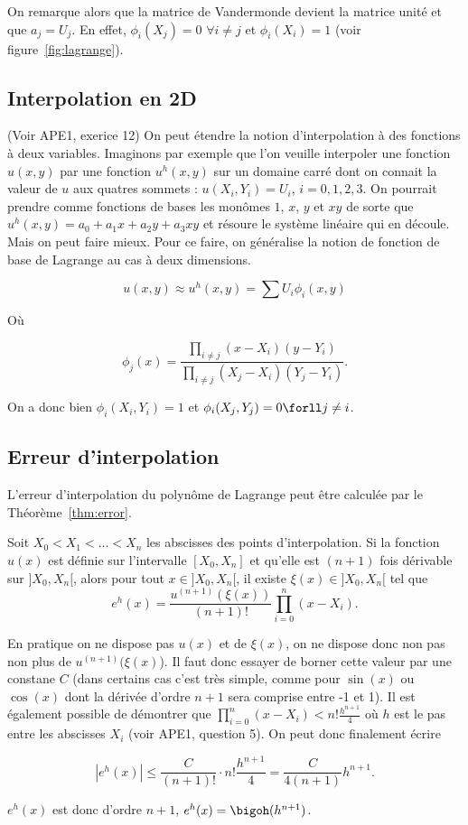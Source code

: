 On remarque alors que la matrice de Vandermonde devient la matrice
unité et que $a_j = U_j$. En effet, $\phi_i(X_j) = 0$ $\forall i \neq j$
et $\phi_i(X_i) = 1$ (voir figure~\ref{fig:lagrange}).

\subsection{Interpolation en 2D}
(Voir APE1, exerice 12) On peut étendre la notion d'interpolation à des fonctions à deux variables. Imaginons 
par exemple que l'on veuille interpoler une fonction $u(x, y)$ par une fonction $u^h(x, y)$
sur un domaine carré dont on connait la valeur de $u$ aux quatres sommets : $u(X_i, Y_i) = U_i$,
$i = 0, 1, 2, 3.$ On pourrait prendre comme fonctions de bases les monômes $1$, $x$, $y$ et $xy$
de sorte que $u^h(x, y) = a_0 + a_1x + a_2y + a_3xy$ et résoure le système linéaire qui en découle.
Mais on peut faire mieux. Pour ce faire, on généralise la notion de fonction de base de Lagrange au 
cas à deux dimensions.

$$u(x, y) \approx u^h(x, y) = \sum U_i \phi_i(x, y)$$

Où

$$\phi_j(x) = \frac{\prod_{i \neq j} (x - X_i)(y - Y_i)}
  {\prod_{i \neq j} (X_j - X_i)(Y_j - Y_i)}.$$
	
On a donc bien $\phi_i(X_i, Y_i) = 1$ et $\phi_i(X_j, Y_j) = 0 \forll j\neq i$.  

\subsection{Erreur d'interpolation}
L'erreur d'interpolation du polynôme de Lagrange peut être calculée
par le Théorème~\ref{thm:error}.
\begin{mytheo}
  \label{thm:error}
  Soit $X_0 < X_1 < \ldots < X_n$ les abscisses des points d'interpolation.
  Si la fonction $u(x)$ est définie sur l'intervalle $[X_0, X_n]$ et qu'elle
  est $(n+1)$ fois dérivable sur $]X_0, X_n[$, alors pour tout
  $x \in ]X_0, X_n[$, il existe $\xi(x) \in ]X_0, X_n[$ tel que
  \[ e^h(x) = \frac{u^{(n+1)}(\xi(x))}{(n+1)!}
  \prod_{i=0}^n (x - X_i). \]
\end{mytheo}

\begin{myrem}\label{rem:borne}
	En pratique on ne dispose pas $u(x)$ et de $\xi(x)$, on ne dispose donc non 
	pas non plus de	$u^{(n+1)}(\xi(x)$). Il faut donc essayer de borner cette
	valeur par une constane $C$ (dans certains cas c'est très simple, comme
	pour $\sin(x)$ ou $\cos(x)$ dont la dérivée d'ordre $n+1$ sera comprise
	entre -1 et 1). Il est également possible de démontrer que $\prod_{i=0}^n (x - X_i)
	< n! \frac{h^{n+1}}{4}$ où $h$ est le pas entre les abscisses $X_i$ (voir APE1, question 5).
	On peut donc finalement écrire 
	
	$$|e^h(x)| \leq \frac{C}{(n+1)!} \cdot n! \frac{h^{n+1}}{4} = \frac{C}{4(n+1)}h^{n+1}.$$
	
  $e^h(x)$ est donc d'ordre $n+1$, $e^h(x) = \bigoh(h^{n+1})$.
\end{myrem}

